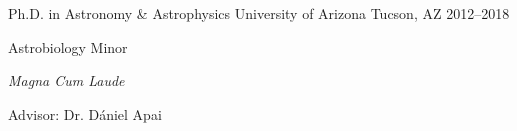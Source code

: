 

\begin{cventries}

  \cventry
    {Ph.D. in Astronomy \& Astrophysics} %
    {University of Arizona} %
    {Tucson, AZ} %
    {2012--2018} %
    {
      \begin{cvitems} %
        \item {Astrobiology Minor}
        \item {\textit{Magna Cum Laude}}
        \item {Advisor: Dr. D\'aniel Apai}
      \end{cvitems}
    }

\end{cventries}

